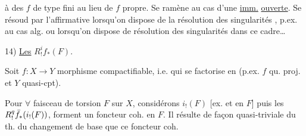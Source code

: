 
à des $f$ de type fini au lieu de $f$
propre. Se ramène au cas d'une \uline{imm.}
\uline{ouverte}. Se résoud par l'affirmative
lorsqu'on dispose de la résolution des
singularités , p.ex. au cas 
 
alg. ou lorsqu'on dispose de résolution
des singularités  dans ce cadre\ldots

14) \uline{Les} $R^i_!f_*(F)$.

Soit $f:X\longrightarrow Y$ morphisme compactifiable,
i.e. qui se factorise en
(p.ex. $f$ qu. proj. et $Y$ quasi-cpt).

Pour $\forall$ faisceau de torsion $F$ sur $X$,
considérons $i_!(F)$ [ex. et en $F$]
puis les $R^q_{{{!}}}\bar f_*(i_!(F))$, forment
un foncteur coh. en $F$. Il résulte
de façon quasi-triviale du th. du changement
de base que ce foncteur coh.

